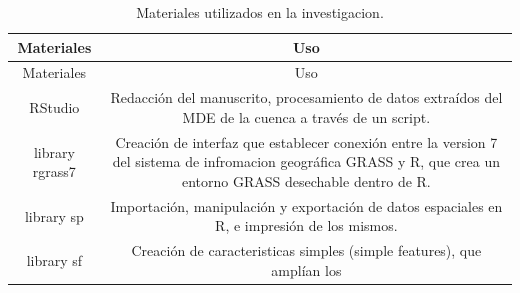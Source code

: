 \documentclass[11pt,]{article}
\begin{document}
\begin{longtable}[]{@{}cc@{}}
\caption{\label{tab:materiales} Materiales utilizados en la
investigacion.}\tabularnewline
\toprule
\begin{minipage}[b]{0.11\columnwidth}\centering\strut
Materiales\strut
\end{minipage} & \begin{minipage}[b]{0.83\columnwidth}\centering\strut
Uso\strut
\end{minipage}\tabularnewline
\midrule
\endfirsthead
\toprule
\begin{minipage}[b]{0.11\columnwidth}\centering\strut
Materiales\strut
\end{minipage} & \begin{minipage}[b]{0.83\columnwidth}\centering\strut
Uso\strut
\end{minipage}\tabularnewline
\midrule
\endhead
\begin{minipage}[t]{0.11\columnwidth}\centering\strut
RStudio\strut
\end{minipage} & \begin{minipage}[t]{0.83\columnwidth}\centering\strut
Redacción del manuscrito, procesamiento de datos extraídos del MDE de la
cuenca a través de un script.\strut
\end{minipage}\tabularnewline
\begin{minipage}[t]{0.11\columnwidth}\centering\strut
library rgrass7\strut
\end{minipage} & \begin{minipage}[t]{0.83\columnwidth}\centering\strut
Creación de interfaz que establecer conexión entre la version 7 del
sistema de infromacion geográfica GRASS y R, que crea un entorno GRASS
desechable dentro de R.\strut
\end{minipage}\tabularnewline
\begin{minipage}[t]{0.11\columnwidth}\centering\strut
library sp\strut
\end{minipage} & \begin{minipage}[t]{0.83\columnwidth}\centering\strut
Importación, manipulación y exportación de datos espaciales en R, e
impresión de los mismos.\strut
\end{minipage}\tabularnewline
\begin{minipage}[t]{0.11\columnwidth}\centering\strut
library sf\strut
\end{minipage} & \begin{minipage}[t]{0.83\columnwidth}\centering\strut
Creación de caracteristicas simples (simple features), que amplían los

\end{minipage}
\end{longtable}
\end{document}
